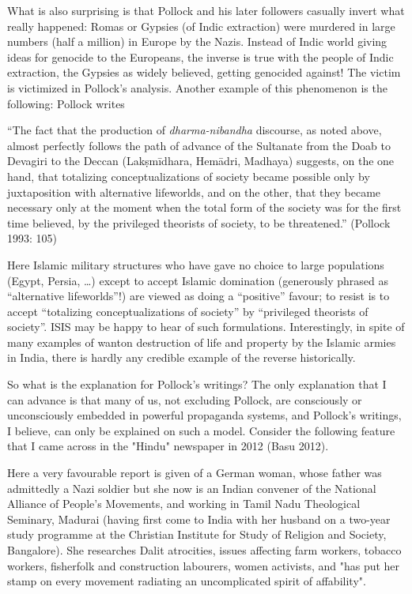 What is also surprising is that Pollock and his later followers casually invert what really happened: Romas or Gypsies (of Indic extraction) were murdered in large numbers (half a million) in Europe by the Nazis. Instead of Indic world giving ideas for genocide to the Europeans, the inverse is true with the people of Indic extraction, the Gypsies as widely believed, getting genocided against! The victim is victimized in Pollock's analysis. Another example of this phenomenon is the following: Pollock writes

\begin{myquote}
“The fact that the production of {\sl dharma-nibandha} discourse, as noted above, almost perfectly follows the path of advance of the Sultanate from the Doab to Devagiri to the Deccan (Lakṣmīdhara, Hemādri, Madhaya) suggests, on the one hand, that totalizing conceptualizations of society became possible only by juxtaposition with alternative lifeworlds, and on the other, that they became necessary only at the moment when the total form of the society was for the first time believed, by the privileged theorists of society, to be threatened.” 
\hfill(Pollock 1993: 105)
\end{myquote}

Here Islamic military structures who have gave no choice to large populations (Egypt, Persia, …) except to accept Islamic domination (generously phrased as “alternative lifeworlds”!) are viewed as doing a “positive” favour; to resist is to accept “totalizing conceptualizations of society” by “privileged theorists of society”. ISIS may be happy to hear of such formulations. Interestingly, in spite of many examples of wanton destruction of life and property by the Islamic armies in India, there is hardly any credible example of the reverse historically. 

So what is the explanation for Pollock's writings? The only explanation that I can advance is that many of us, not excluding Pollock, are consciously or unconsciously embedded in powerful propaganda systems, and Pollock’s writings, I believe, can only be explained on such a model.  Consider the following feature that I came across in the "Hindu" newspaper in 2012 (Basu 2012).

Here a very favourable report is given of a German woman, whose father was admittedly a Nazi soldier but she now is an Indian convener of the National Alliance of People's Movements, and working in Tamil Nadu Theological Seminary, Madurai (having first come to India with her husband on a two-year study programme at the Christian Institute for Study of Religion and Society, Bangalore). She researches Dalit atrocities, issues affecting farm workers, tobacco workers, fisherfolk and construction labourers, women activists, and "has put her stamp on every movement radiating an uncomplicated spirit of affability".

